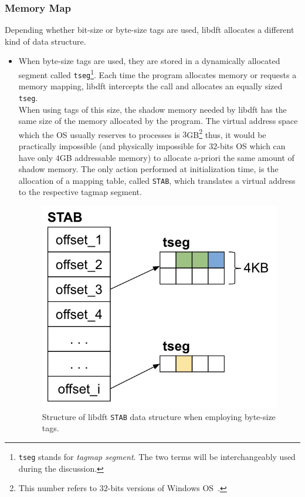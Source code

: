 \documentclass[LaM,binding=0.6cm]{sapthesis}
\begin{document}
\subsubsection{Memory Map}
\label{subsubsec:memorymap}
Depending whether bit-size or byte-size tags are used, libdft allocates a different kind of data structure.
\begin{itemize}
\item When byte-size tags are used, they are stored in a dynamically allocated segment called \texttt{tseg}\footnote{\texttt{tseg} stands for \textit{tagmap segment}. The two terms will be interchangeably used during the discussion.}. Each time the program allocates memory or requests a memory mapping, libdft intercepts the call and allocates an equally sized \texttt{tseg}.\\
When using tags of this size, the shadow memory needed by libdft has the same size of the memory allocated by the program. The virtual address space which the OS usually reserves to processes is $3$GB\footnote{This number refers to $32$-bits versions of Windows OS~\cite{VirtualA15:online}.} thus, it would be practically impossible (and physically impossible for $32$-bits OS which can have only $4$GB addressable memory) to allocate a-priori the same amount of shadow memory. The only action performed at initialization time, is the allocation of a mapping table, called \texttt{STAB}, which translates a virtual address to the respective tagmap segment.

\begin{figure}[h!]
\centering
\includegraphics[scale=.7]{images/techn10}
\caption{Structure of libdft \texttt{STAB} data structure when employing byte-size tags.}
\end{figure}


\end{itemize}
\end{document}
